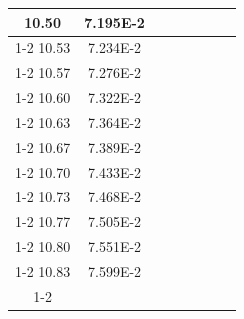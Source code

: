 \documentclass[article,12pt]{elsarticle}
\begin{document}
\begin{longtable}[c]{|c|c|cccccc}
10.50    & 7.195E-2  &                       &                              &                            &                       &                              &                               \\ \cline{1-2}
10.53    & 7.234E-2  &                       &                              &                            &                       &                              &                               \\ \cline{1-2}
10.57    & 7.276E-2  &                       &                              &                            &                       &                              &                               \\ \cline{1-2}
10.60    & 7.322E-2  &                       &                              &                            &                       &                              &                               \\ \cline{1-2}
10.63    & 7.364E-2  &                       &                              &                            &                       &                              &                               \\ \cline{1-2}
10.67    & 7.389E-2  &                       &                              &                            &                       &                              &                               \\ \cline{1-2}
10.70    & 7.433E-2  &                       &                              &                            &                       &                              &                               \\ \cline{1-2}
10.73    & 7.468E-2  &                       &                              &                            &                       &                              &                               \\ \cline{1-2}
10.77    & 7.505E-2  &                       &                              &                            &                       &                              &                               \\ \cline{1-2}
10.80    & 7.551E-2  &                       &                              &                            &                       &                              &                               \\ \cline{1-2}
10.83    & 7.599E-2  &                       &                              &                            &                       &                              &                               \\ \cline{1-2}

\end{longtable}
\end{document}
